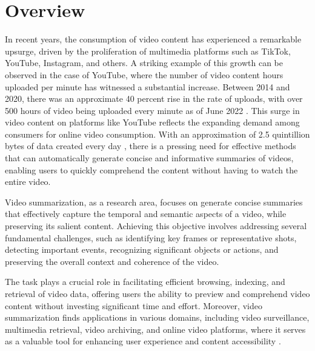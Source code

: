 \section{Overview}
\label{section:intro-overview}

In recent years, the consumption of video content has experienced a remarkable upsurge, driven by the proliferation of multimedia platforms such as TikTok, YouTube, Instagram, and others. A striking example of this growth can be observed in the case of YouTube, where the number of video content hours uploaded per minute has witnessed a substantial increase. Between 2014 and 2020, there was an approximate 40 percent rise in the rate of uploads, with over 500 hours of video being uploaded every minute as of June 2022 \cite{YoutubeHours}. This surge in video content on platforms like YouTube reflects the expanding demand among consumers for online video consumption. With an approximation of 2.5 quintillion bytes of data created every day \cite{Meena2023Review}, there is a pressing need for effective methods that can automatically generate concise and informative summaries of videos, enabling users to quickly comprehend the content without having to watch the entire video. 

Video summarization, as a research area, focuses on generate concise summaries that effectively capture the temporal and semantic aspects of a video, while preserving its salient content. Achieving this objective involves addressing several fundamental challenges, such as identifying key frames or representative shots, detecting important events, recognizing significant objects or actions, and preserving the overall context and coherence of the video. 

The task plays a crucial role in facilitating efficient browsing, indexing, and retrieval of video data, offering users the ability to preview and comprehend video content without investing significant time and effort. Moreover, video summarization finds applications in various domains, including video surveillance, multimedia retrieval, video archiving, and online video platforms, where it serves as a valuable tool for enhancing user experience and content accessibility \cite{Apostolidis2021Video}.
